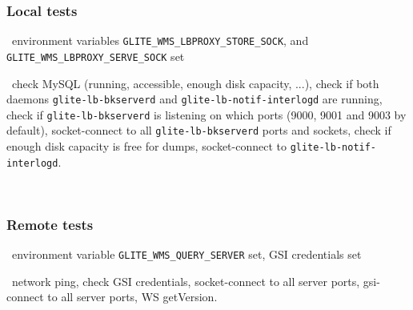 \subsubsection{Local tests}
\req\ environment variables \texttt{GLITE\_WMS\_LBPROXY\_STORE\_SOCK},
and \texttt{GLITE\_WMS\_LBPROXY\_SERVE\_SOCK} set

\what\ check MySQL (running, accessible, enough disk capacity, ...),
check if both daemons \texttt{glite-lb-bkserverd} and \texttt{glite-lb-notif-interlogd} are running,
check if \texttt{glite-lb-bkserverd} is listening on which ports (9000, 9001 and 9003 by default),
socket-connect to all \texttt{glite-lb-bkserverd} ports and sockets,
check if enough disk capacity is free for dumps,
socket-connect to \texttt{glite-lb-notif-interlogd}.

\how\ 


\subsubsection{Remote tests}
\req\ environment variable \texttt{GLITE\_WMS\_QUERY\_SERVER} set, GSI credentials set

\what\ network ping,
check GSI credentials,
socket-connect to all server ports,
gsi-connect to all server ports,
WS getVersion.

\how\ 



